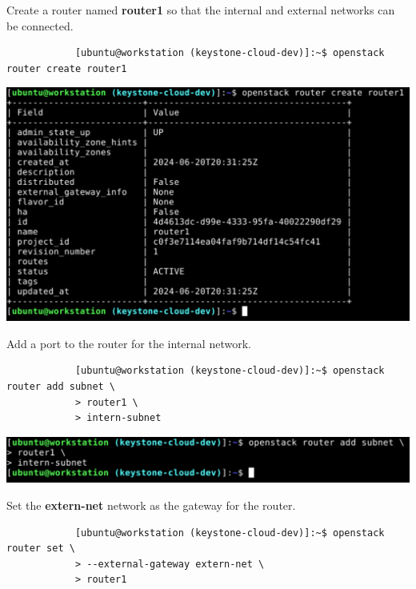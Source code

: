 \documentclass[letterpaper, 12pt]{article}
\begin{document}
\begin{enumerate}
    \begin{labstep}
        Create a router named \textbf{router1} so that the internal and external networks can be connected.
        \begin{lstlisting}
            [ubuntu@workstation (keystone-cloud-dev)]:~$ openstack router create router1
        \end{lstlisting}

        \begin{center}
            \includegraphics[width=\linewidth]{images/part1/step26.png}
        \end{center}
    \end{labstep}

    \begin{labstep}
        Add a port to the router for the internal network.
        \begin{lstlisting}
            [ubuntu@workstation (keystone-cloud-dev)]:~$ openstack router add subnet \
            > router1 \
            > intern-subnet
        \end{lstlisting}

        \begin{center}
            \includegraphics[width=\linewidth]{images/part1/step27.png}
        \end{center}
    \end{labstep}

    \begin{labstep}
        Set the \textbf{extern-net} network as the gateway for the router.
        \begin{lstlisting}
            [ubuntu@workstation (keystone-cloud-dev)]:~$ openstack router set \
            > --external-gateway extern-net \
            > router1
        \end{lstlisting}


\end{labstep}
\end{enumerate}
\end{document}
